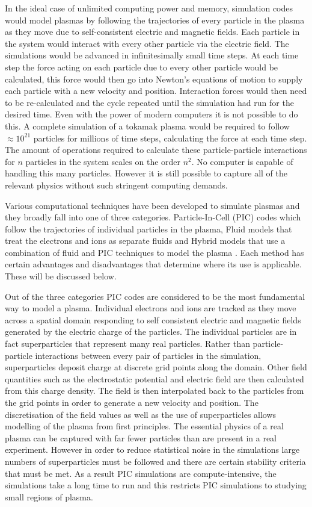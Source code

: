 In the ideal case of unlimited computing power and memory, simulation codes would model plasmas by following the trajectories of every particle in the plasma as they move due to self-consistent electric and magnetic fields. Each particle in the system would interact with every other particle via the electric field.  The simulations would be advanced in infinitesimally small time steps. At each time step the force acting on each particle due to every other particle would be calculated, this force would then go into Newton's equations of motion to supply each particle with a new velocity and position. Interaction forces would then need to be re-calculated and the cycle repeated until the simulation had run for the desired time. Even with the power of modern computers it is not possible to do this. A complete simulation of a  tokamak plasma would be required to follow $\approx 10^{21}$ particles for millions of time steps, calculating the force at each time step. The amount of operations required to calculate these particle-particle interactions for $n$ particles in the system scales on the order $n^2$. No computer is capable of handling this many particles. However it is still possible to capture all of the relevant physics without such stringent computing demands.

 
Various computational techniques have been developed to simulate plasmas and they broadly fall into one of three categories. Particle-In-Cell (PIC) codes which follow the trajectories of individual particles in the plasma, Fluid models that treat the electrons and ions as separate fluids and Hybrid models that use a combination of fluid and PIC techniques to model the plasma \cite{simulation_types}. Each method has certain advantages and disadvantages that determine where its use is applicable. These will be discussed below.

Out of the three categories PIC codes are considered to be the most fundamental way to model a plasma. Individual electrons and ions are tracked as they move across a spatial domain responding to self consistent electric and magnetic fields generated by the electric charge of the particles. The individual particles are in fact superparticles that represent many real particles.  Rather than particle-particle interactions between every pair of particles in the simulation, superparticles deposit charge at discrete grid points along the domain. Other field quantities such as the electrostatic potential and electric field are then calculated from this charge density. The field is then interpolated back to the particles from the grid points in order to generate a new velocity and position. The discretisation of the field values as well as the use of superparticles allows modelling of the plasma from first principles. The essential physics of a real plasma can be captured with far fewer particles than are present in a real experiment. However in order to reduce statistical noise in the simulations large numbers of superparticles must be followed and there are certain stability criteria that must be met. As a result PIC simulations are compute-intensive, the simulations take a long time to run and this restricts PIC simulations to studying small regions of plasma.

